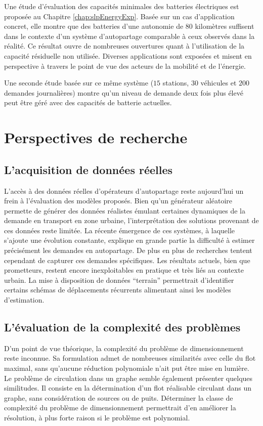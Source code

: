 \medskip
Une étude d'évaluation des capacités minimales des batteries électriques est proposée au Chapitre \ref{chap:slpEnergyExp}.
Basée sur un cas d'application concret, elle montre que des batteries d'une autonomie de $80$ kilomètres suffisent dans le contexte d'un système d'autopartage comparable à ceux observés dans la réalité.
Ce résultat ouvre de nombreuses ouvertures quant à l'utilisation de la capacité résiduelle non utilisée.
Diverses applications sont exposées et misent en perspective à travers le point de vue des acteurs de la mobilité et de l'énergie.

Une seconde étude basée sur ce même système ($15$ stations, $30$ véhicules et $200$ demandes journalières) montre qu'un niveau de demande deux fois plus élevé peut être géré avec des capacités de batterie actuelles.


\section*{Perspectives de recherche}
\subsection*{L'acquisition de données réelles}

L'accès à des données réelles d'opérateurs d'autopartage reste aujourd'hui un frein à l'évaluation des modèles proposés.
Bien qu'un générateur aléatoire permette de générer des données réalistes émulant certaines dynamiques de la demande en transport en zone urbaine, l'interprétation des solutions provenant de ces données reste limitée.
La récente émergence de ces systèmes, à laquelle s'ajoute une évolution constante, explique en grande partie la difficulté à estimer précisément les demandes en autopartage.
De plus en plus de recherches tentent cependant de capturer ces demandes spécifiques.
Les résultats actuels, bien que prometteurs, restent encore inexploitables en pratique et très liés au contexte urbain.
La mise à disposition de données ``terrain'' permettrait d'identifier certains schémas de déplacements récurrents alimentant ainsi les modèles d'estimation.

\subsection*{L'évaluation de la complexité des problèmes}
D'un point de vue théorique, la complexité du problème de dimensionnement reste inconnue.
Sa formulation admet de nombreuses similarités avec celle du flot maximal, sans qu'aucune réduction polynomiale n'ait put être mise en lumière.
Le problème de circulation dans un graphe semble également présenter quelques similitudes.
Il consiste en la détermination d'un flot réalisable circulant dans un graphe, sans considération de sources ou de puits.
Déterminer la classe de complexité du problème de dimensionnement permettrait d'en améliorer la résolution, à plus forte raison si le problème est polynomial.

